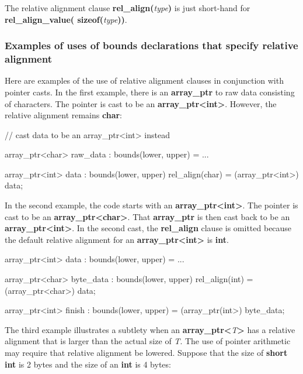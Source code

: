 \documentclass[]{article}
\begin{document}
The relative alignment clause \textbf{rel\_align(}\emph{type}\textbf{)}
is just short-hand for \textbf{rel\_align\_value(
sizeof(}\emph{type}\textbf{))}.

\subsubsection{\texorpdfstring{\protect\hypertarget{ux5fToc437460761}{}{\protect\hypertarget{ux5fToc440445439}{}{\protect\hypertarget{ux5fToc440449221}{}{\protect\hypertarget{ux5fToc440551871}{}{}}}}Examples
of uses of bounds declarations that specify relative
alignment}{Examples of uses of bounds declarations that specify relative alignment}}\label{examples-of-uses-of-bounds-declarations-that-specify-relative-alignment}

Here are examples of the use of relative alignment clauses in
conjunction with pointer casts. In the first example, there is an
\textbf{array\_ptr} to raw data consisting of characters. The pointer is
cast to be an \textbf{array\_ptr\textless{}int\textgreater{}}. However,
the relative alignment remains \textbf{char}:

// cast data to be an array\_ptr\textless{}int\textgreater{} instead

array\_ptr\textless{}char\textgreater{} raw\_data : bounds(lower, upper)
= ...

array\_ptr\textless{}int\textgreater{} data : bounds(lower, upper)
rel\_align(char) = (array\_ptr\textless{}int\textgreater{}) data;

In the second example, the code starts with an
\textbf{array\_ptr\textless{}int\textgreater{}}. The pointer is cast to
be an \textbf{array\_ptr\textless{}char\textgreater{}}. That
\textbf{array\_ptr} is then cast back to be an
\textbf{array\_ptr\textless{}int\textgreater{}}. In the second cast, the
\textbf{rel\_align} clause is omitted because the default relative
alignment for an \textbf{array\_ptr\textless{}int\textgreater{}} is
\textbf{int}.

array\_ptr\textless{}int\textgreater{} data : bounds(lower, upper) = ...

array\_ptr\textless{}char\textgreater{} byte\_data : bounds(lower,
upper) rel\_align(int) = (array\_ptr\textless{}char\textgreater{}) data;

array\_ptr\textless{}int\textgreater{} finish : bounds(lower, upper) =
(array\_ptr(int\textgreater{}) byte\_data;

The third example illustrates a subtlety when an
\textbf{array\_ptr\textless{}}\emph{T}\textbf{\textgreater{}} has a
relative alignment that is larger than the actual size of \emph{T}. The
use of pointer arithmetic may require that relative alignment be
lowered. Suppose that the size of \textbf{short int} is 2 bytes and the
size of an \textbf{int} is 4 bytes:
\end{document}
